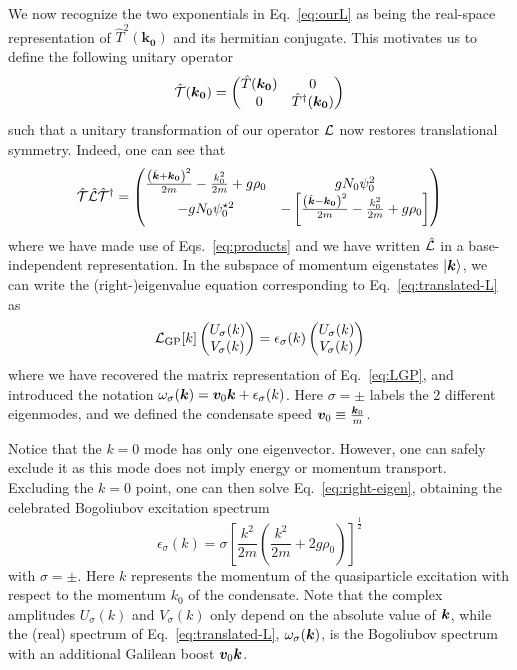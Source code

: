 We now recognize the two exponentials in Eq.~\eqref{eq:ourL} as being
the real-space representation of $\hat{T}^2(\bm{k_0})$ and its
hermitian conjugate. This motivates us to define the following unitary
operator
%
\begin{equation}\label{eq:ucal}
  \hat{\mathcal{T}}(\bm{k_0}) = \begin{pmatrix} \hat{T}(\bm{k_0}) & 0\\ 0 & \hat{T}^{\dagger}(\bm{k_0}) \end{pmatrix}
\end{equation}
% 
such that a unitary transformation of our operator $\mathcal{L}$ now restores translational
symmetry. Indeed, one can see that
%
\begin{equation}\label{eq:translated-L}
  \hat{\mathcal{T}} \hat{\mathcal{L}} \hat{\mathcal{T}}^{\dagger} = \begin{pmatrix} \frac{\left(\hat{\bm{k}} + \bm{k_0}\right)^2}{2m} - \frac{k_0^2}{2m} + g\rho_0 & g N_0 \psi_0^2\\ - g N_0 \psi_0^{\star 2} & -\left[\frac{\left(\hat{\bm{k}} - \bm{k_0}\right)^2}{2m} - \frac{k_0^2}{2m} + g\rho_0 \right] \end{pmatrix}
\end{equation}
% 
where we have made use of Eqs.~\eqref{eq:products} and we have written
$\hat{\mathcal{L}}$ in a base-independent representation.  In the subspace of
momentum eigenstates $\vert \bm{k} \rangle$, we can write the (right-)eigenvalue
equation corresponding to Eq.~\eqref{eq:translated-L} as
%
\begin{equation}\label{eq:right-eigen}
  \mathcal{L}_{\text{GP}} [k] \begin{pmatrix} U_\sigma(k)\\ V_\sigma(k) \end{pmatrix} = \epsilon_\sigma(k) \begin{pmatrix} U_\sigma(k)\\ V_\sigma(k) \end{pmatrix}
\end{equation}
% 
where we have recovered the matrix representation of
Eq.~\eqref{eq:LGP}, and introduced the notation
$\omega_\sigma(\bm{k}) = \bm{v}_0 \bm{k} + \epsilon_\sigma(k)$. Here
$\sigma = \pm$ labels the 2 different eigenmodes, and we defined the
condensate speed $\bm{v}_0 \equiv \frac{\bm{k}_0}{m}$.

Notice that the $k=0$ mode has only one eigenvector. However, one can
safely exclude it as this mode does not imply energy or momentum
transport. Excluding the $k = 0$ point, one can then solve
Eq.~\eqref{eq:right-eigen}, obtaining the celebrated Bogoliubov
excitation spectrum
%
\begin{equation}\label{eq:bogoliubov}
  \epsilon_\sigma(k) = \sigma \left[\frac{k^2}{2m}\left(\frac{k^2}{2m} + 2 g \rho_0 \right) \right]^{\frac{1}{2}}
\end{equation}
% 
with $\sigma = \pm$. Here $k$ represents the momentum of the
quasiparticle excitation with respect to the momentum $k_0$ of the
condensate. Note that the complex amplitudes $U_\sigma(k)$ and
$V_\sigma(k)$ only depend on the absolute value of $\bm{k}$, while the
(real) spectrum of Eq.~\eqref{eq:translated-L}, $\omega_\sigma(\bm{k})$,
is the Bogoliubov spectrum with an additional Galilean boost
$\bm{v}_0 \bm{k}$.

